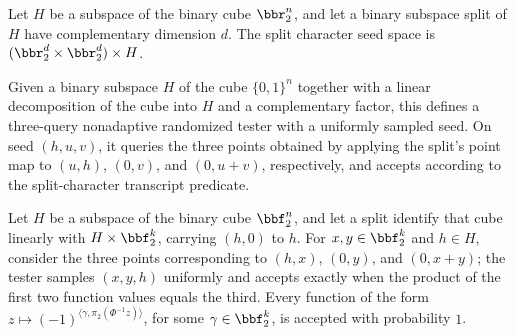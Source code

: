\begin{definition}
\label{FABL.SplitCharacterSeed}
\leanok
{}
Let $H$ be a subspace of the binary cube $\bbr_2^n$, and let a binary subspace split of
$H$ have complementary dimension $d$. The split character seed space is
$(\bbr_2^d\times\bbr_2^d)\times H$.
\end{definition}

\begin{definition}
\label{FABL.splitCharacterFunctionTester}
\leanok
{}
Given a binary subspace $H$ of the cube $\{0,1\}^n$ together with a linear decomposition
of the cube into $H$ and a complementary factor, this defines a three-query nonadaptive
randomized tester with a uniformly sampled seed. On seed $(h,u,v)$, it queries the three
points obtained by applying the split's point map to $(u,h)$, $(0,v)$, and $(0,u+v)$,
respectively, and accepts according to the split-character transcript predicate.
\end{definition}

\begin{theorem}
\label{FABL.splitCharacterFunctionTester_complete}
\leanok
{}
Let $H$ be a subspace of the binary cube $\bbf_2^n$, and let a split identify that cube
linearly with $H\times\bbf_2^k$, carrying $(h,0)$ to $h$. For $x,y\in\bbf_2^k$ and $h\in
H$, consider the three points corresponding to $(h,x)$, $(0,y)$, and $(0,x+y)$; the
tester samples $(x,y,h)$ uniformly and accepts exactly when the product of the first two
function values equals the third. Every function of the form
$z\mapsto(-1)^{\langle\gamma,\pi_2(\Phi^{-1}z)\rangle}$, for some $\gamma\in\bbf_2^k$,
is accepted with probability $1$.
\end{theorem}

